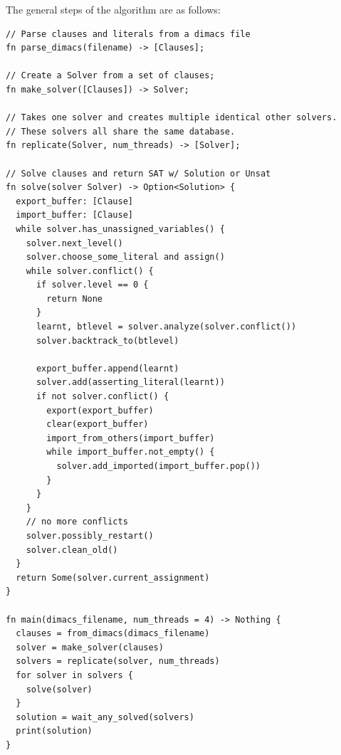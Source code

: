 \documentclass[11pt]{extarticle}
\begin{document}
The general steps of the algorithm are as follows:
\begin{lstlisting}[caption = Implementation Pseudocode]
// Parse clauses and literals from a dimacs file
fn parse_dimacs(filename) -> [Clauses];

// Create a Solver from a set of clauses;
fn make_solver([Clauses]) -> Solver;

// Takes one solver and creates multiple identical other solvers.
// These solvers all share the same database.
fn replicate(Solver, num_threads) -> [Solver];

// Solve clauses and return SAT w/ Solution or Unsat
fn solve(solver Solver) -> Option<Solution> {
  export_buffer: [Clause]
  import_buffer: [Clause]
  while solver.has_unassigned_variables() {
    solver.next_level()
    solver.choose_some_literal and assign()
    while solver.conflict() {
      if solver.level == 0 {
        return None
      }
      learnt, btlevel = solver.analyze(solver.conflict())
      solver.backtrack_to(btlevel)

      export_buffer.append(learnt)
      solver.add(asserting_literal(learnt))
      if not solver.conflict() {
        export(export_buffer)
        clear(export_buffer)
        import_from_others(import_buffer)
        while import_buffer.not_empty() {
          solver.add_imported(import_buffer.pop())
        }
      }
    }
    // no more conflicts
    solver.possibly_restart()
    solver.clean_old()
  }
  return Some(solver.current_assignment)
}

fn main(dimacs_filename, num_threads = 4) -> Nothing {
  clauses = from_dimacs(dimacs_filename)
  solver = make_solver(clauses)
  solvers = replicate(solver, num_threads)
  for solver in solvers {
    solve(solver)
  }
  solution = wait_any_solved(solvers)
  print(solution)
}
\end{lstlisting}
\end{document}
